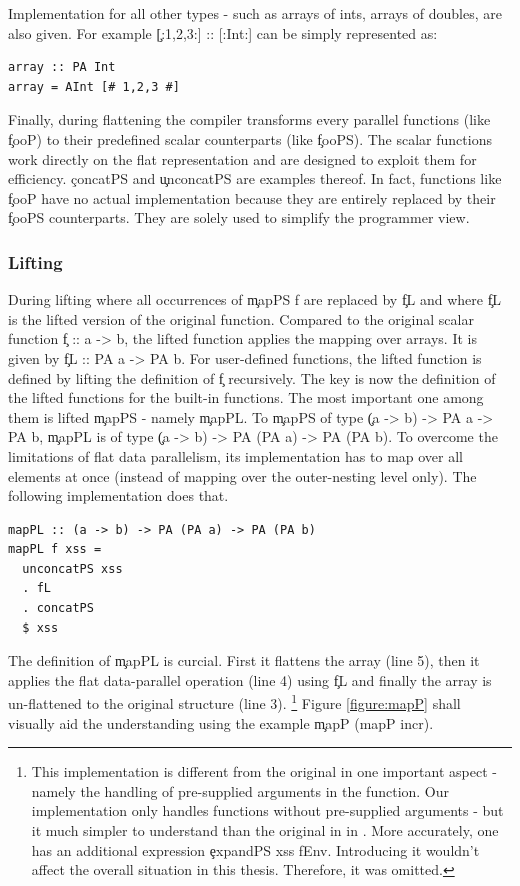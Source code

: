      Implementation for all other types - such as arrays of ints,
      arrays of doubles, are also given. For example \c{[:1,2,3:] :: [:Int:]} can be simply
      represented as:
      \begin{lstlisting}
array :: PA Int
array = AInt [# 1,2,3 #]
      \end{lstlisting}
      
      Finally, during flattening the compiler transforms
      every parallel functions (like \c{fooP}) to
      their predefined scalar counterparts (like \c{fooPS}).
      The scalar functions work directly on the flat representation
      and are designed to exploit them for efficiency.
      \c{concatPS} and \c{unconcatPS} are examples thereof.
      In fact, functions like \c{fooP} have no actual implementation
      because they are entirely replaced by their \c{fooPS} counterparts.
      They are solely used to simplify the programmer view.
    
      
    \subsubsection{Lifting}
      During lifting where all occurrences of \c{mapPS f} are
      replaced by \c{fL} and where \c{fL}
      is the lifted version of the original function.
      Compared to the original scalar function \c{f :: a -> b}, the lifted
      function applies the mapping over arrays. It is given by \c{fL :: PA a -> PA b}.
      For user-defined functions, the lifted function is defined by lifting the definition of \c{f} recursively.
      The key is now the definition of the lifted functions for the built-in functions.
      The most important one among them is lifted \c{mapPS} - namely \c{mapPL}.
      To \c{mapPS} of type \c{(a -> b) -> PA a -> PA b},
      \c{mapPL} is of type \c{(a -> b) -> PA (PA a) -> PA (PA b)}.
      To overcome the limitations of flat data parallelism,
      its implementation has to map over all elements at once
      (instead of mapping over the outer-nesting level only).
      The following implementation does that.
    \begin{lstlisting}
mapPL :: (a -> b) -> PA (PA a) -> PA (PA b)
mapPL f xss =
  unconcatPS xss
  . fL
  . concatPS
  $ xss
    \end{lstlisting}
    The definition of \c{mapPL} is curcial.
    First it flattens the array (line 5), then it applies
    the flat data-parallel operation (line 4) using \c{fL}
    and finally the array is un-flattened to the original structure (line 3).
    \footnote{This implementation is different from the original in one important aspect - 
    namely the handling of pre-supplied arguments in the function. Our
    implementation only handles functions without pre-supplied arguments -
    but it much simpler to understand than the original in
    in \cite{HighOrdFlat2006}.
    More accurately, one has an additional expression \c{expandPS xss fEnv}.
    Introducing it wouldn't affect the overall situation in this thesis.
    Therefore, it was omitted.
    } 
    Figure \ref{figure:mapP} shall visually aid the understanding
    using the example \c{mapP (mapP incr)}.
    
